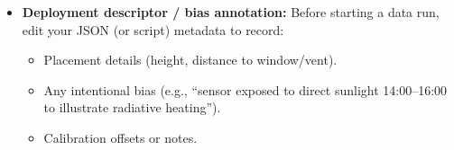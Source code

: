 \documentclass[11pt]{article}
\begin{document}
\begin{itemize}
  \item \textbf{Deployment descriptor / bias annotation:}  
    Before starting a data run, edit your JSON (or script) metadata to record:
    \begin{itemize}
      \item Placement details (height, distance to window/vent).  
      \item Any intentional bias (e.g., “sensor exposed to direct sunlight 14:00–16:00 to illustrate radiative heating”).  
      \item Calibration offsets or notes.
    \end{itemize}
\end{itemize}
\end{document}
